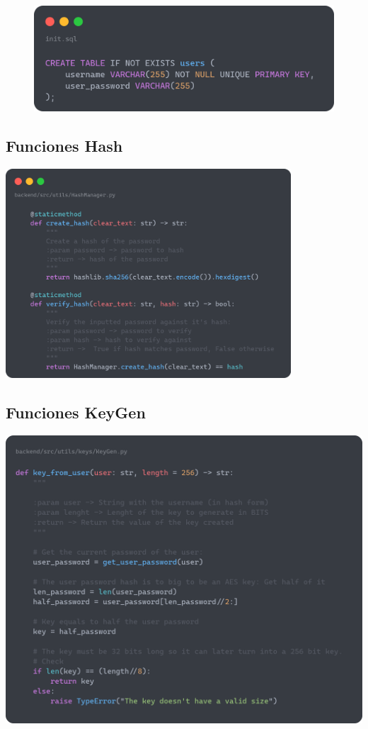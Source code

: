 \documentclass[a4paper,11pt]{article}
\begin{document}
\begin{figure}[htbp]
        \vspace{0.5cm}
        \begin{minipage}[t]{0.7\textwidth} 
            \centering
            \includegraphics[width=\textwidth]{images/users.png}
        \end{minipage}
    \end{figure}


\subsection{Funciones Hash}
    \label{sec:funcionesHash}
    \includegraphics[width=0.8\textwidth]{images/HashFunctions.png} 

\subsection{Funciones KeyGen}
    \label{sec:funcionesKeyGen}
    \includegraphics[width=\textwidth]{images/KeyGen.png}
\end{document}
